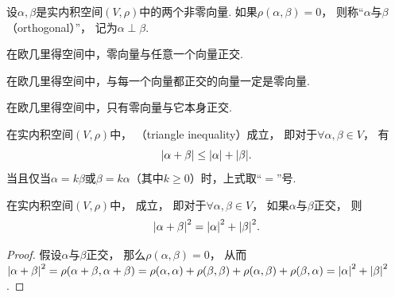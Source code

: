 \begin{definition}
设\(\alpha,\beta\)是实内积空间\((V,\rho)\)中的两个非零向量.
如果\(\rho(\alpha,\beta) = 0\)，
则称“\(\alpha\)与\(\beta\) （orthogonal）”，
记为\(\alpha \perp \beta\).
\end{definition}

\begin{property}
在欧几里得空间中，零向量与任意一个向量正交.
\end{property}

\begin{property}
在欧几里得空间中，与每一个向量都正交的向量一定是零向量.
\end{property}

\begin{property}
在欧几里得空间中，只有零向量与它本身正交.
\end{property}

\begin{corollary}\label{theorem:实内积空间.三角不等式}
在实内积空间\((V,\rho)\)中，
（triangle inequality）成立，
即对于\(\forall \alpha,\beta \in V\)，
有\begin{equation}
	\abs{\alpha+\beta} \leq \abs{\alpha} + \abs{\beta}.
\end{equation}
当且仅当\(\alpha = k\beta\)或\(\beta = k\alpha\)（其中\(k\geq0\)）时，上式取“\(=\)”号.
\end{corollary}

\begin{corollary}\label{theorem:实内积空间.勾股定理}
在实内积空间\((V,\rho)\)中，
成立，
即对于\(\forall \alpha,\beta \in V\)，
如果\(\alpha\)与\(\beta\)正交，
则\begin{equation}
	\abs{\alpha+\beta}^2 = \abs{\alpha}^2 + \abs{\beta}^2.
\end{equation}
\begin{proof}
假设\(\alpha\)与\(\beta\)正交，
那么\(\rho(\alpha,\beta) = 0\)，
从而\(\abs{\alpha+\beta}^2
= \rho(\alpha+\beta,\alpha+\beta)
= \rho(\alpha,\alpha) + \rho(\beta,\beta) + \rho(\alpha,\beta) + \rho(\beta,\alpha)
= \abs{\alpha}^2 + \abs{\beta}^2\).
\end{proof}
\end{corollary}

